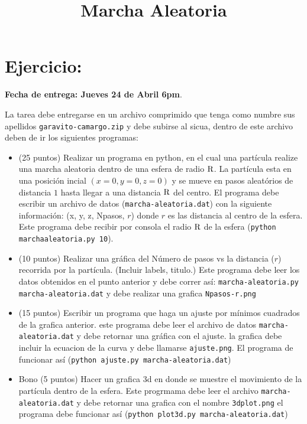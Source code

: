 \documentclass[12pt]{article}
\title{Marcha Aleatoria}
\begin{document}
\date{}
\maketitle


\section*{Ejercicio:}

\textbf{Fecha de entrega: Jueves 24 de Abril 6pm}.

La tarea debe entregarse en un archivo comprimido que tenga como numbre sus apellidos \verb"garavito-camargo.zip"
y debe subirse al sicua, dentro de este archivo deben de ir los siguientes programas: 

\begin{itemize}


\item (25 puntos) Realizar un programa en python, en el cual una part\'icula realize una marcha aleatoria dentro 
   de una esfera de radio $\rm{R}$. La part\'icula esta en una posici\'on incial $(x=0, y=0, z=0)$ y se mueve en pasos aleat\'orios de distancia $1$ hasta llegar a una distancia $\rm{R}$ del centro. El programa debe escribir un archivo de datos (\verb"marcha-aleatoria.dat") con la siguiente informaci\'on: (x, y, z, Npasos, $r$) donde $r$ es las distancia al centro de la esfera. Este programa debe recibir por consola el radio $\rm{R}$ de la esfera (\verb"python marchaaleatoria.py 10").

\item (10 puntos) Realizar una gr\'afica del N\'umero de pasos vs la distancia ($r$) recorrida por la part\'icula.
	(Incluir labels, titulo.) Este programa debe leer los datos obtenidos en el punto anterior y debe correr as\'i:
	\verb"marcha-aleatoria.py marcha-aleatoria.dat" y debe realizar una grafica \verb"Npasos-r.png"
	
\item (15 puntos) Escribir un programa que haga un ajuste por m\'inimos cuadrados de la grafica anterior.
		este programa debe leer el archivo de datos \verb"marcha-aleatoria.dat" y debe retornar una gr\'afica 
		con el ajuste. la grafica debe incluir la ecuacion de la curva y debe llamarse \verb"ajuste.png".
		El programa de funcionar as\'i (\verb"python ajuste.py marcha-aleatoria.dat")

\item Bono (5 puntos) Hacer un grafica 3d en donde se muestre el movimiento de la part\'icula dentro de la esfera.
		Este progrmama debe leer el archivo \verb"marcha-aleatoria.dat" y debe retornar una grafica con el nombre \verb"3dplot.png" el programa debe funcionar as\'i (\verb"python plot3d.py marcha-aleatoria.dat")
\end{itemize}
\end{document}
